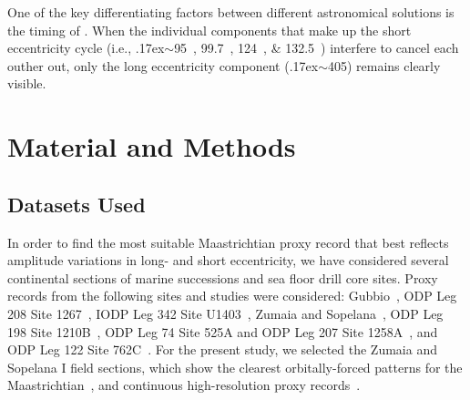 \documentclass[draft]{agujournal2019}
\newcommand{\appr}{\raise.17ex\hbox{\(\scriptstyle\sim\)}} %
\newcommand{\ijk}{\textcolor{blue}}
\begin{document}
One of the key differentiating factors between different astronomical solutions is the timing of .
When the individual components that make up the short eccentricity cycle (i.e., \appr\qtylist{95;99.7;124;132.5}{\kiloyear}) interfere to cancel each outher out, only the long eccentricity component (\appr\qty{405}{\kyr}) remains clearly visible.


\section{Material and Methods}\label{sec:mm}


\subsection{Datasets Used}\label{sec:data}

In order to find the most suitable Maastrichtian proxy record that best reflects amplitude variations in long- and short eccentricity,
we have considered several continental sections of marine successions and sea floor drill core sites.
Proxy records from the following sites and studies were considered:
Gubbio~\cite{Voigt2012,Sinnesael2016},
ODP Leg 208 Site 1267~\cite{Westerhold2007,Westerhold2008,Husson2011},
IODP Leg 342 Site U1403~\cite{Batenburg2018},
Zumaia and Sopelana~\cite{tenKateSprenger1993,Batenburg2012,Batenburg2014,Dinares-Turell2013},
ODP Leg 198 Site 1210B~\cite{Jung2012,Kim2022},
ODP Leg 74 Site 525A and ODP Leg 207 Site 1258A~,
and ODP Leg 122 Site 762C~.
For the present study, we selected the Zumaia and Sopelana I field sections,
which show the clearest orbitally-forced patterns for the Maastrichtian~\cite{tenKateSprenger1993,Batenburg2012,Dinares-Turell2013},
and continuous high-resolution proxy records~\cite{Batenburg2012,Batenburg2014}.
\end{document}
